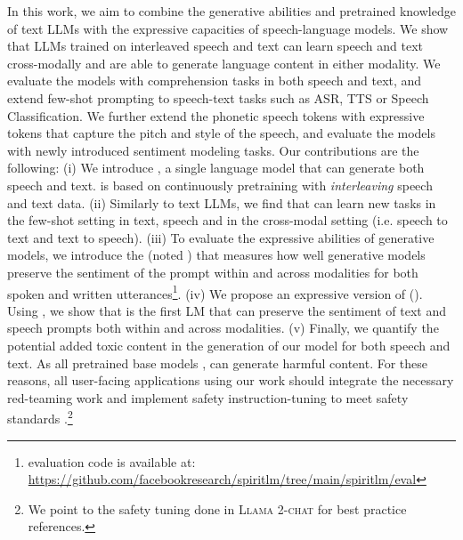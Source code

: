 In this work, we aim to combine the generative abilities and pretrained knowledge of text LLMs with the expressive capacities of speech-language models. We show that LLMs trained on interleaved speech and text can learn speech and text cross-modally and are able to generate language content in either modality.
We evaluate the models with comprehension tasks in both speech and text, and extend few-shot prompting to speech-text tasks such as ASR, TTS or Speech Classification.
We further extend the phonetic speech tokens with expressive tokens that capture the pitch and style of the speech, and evaluate the models with newly introduced sentiment modeling tasks. Our contributions are the following:
(i) We introduce \spot{}, a single language model that can generate both speech and text. \spot is based on continuously pretraining \llamatwo with \textit{interleaving} speech and text data. (ii) Similarly to text LLMs, we find that \spot can learn new tasks in the few-shot setting in text, speech and in the cross-modal setting (i.e. speech to text and text to speech). (iii) To evaluate the expressive abilities of generative models, we introduce the \sentimentbenchmark (noted \sentimentbenchmarkSHORT) that measures how well generative models preserve the sentiment of the prompt within and across modalities for both spoken and written utterances\footnote{\label{stsppage}\sentimentbenchmarkSHORT evaluation code is available at: \url{https://github.com/facebookresearch/spiritlm/tree/main/spiritlm/eval}}. (iv) We propose an expressive version of \spot (\spotexpressive). Using \sentimentbenchmarkSHORT, we show that \spot is the first LM that can preserve the sentiment of text and speech prompts both within and across modalities. (v) Finally, we quantify the potential added toxic content in the generation of our model for both speech and text. As all pretrained base models \citep{stochastic_parrots,Solaiman}, \spot can generate harmful content. For these reasons, all user-facing applications using our work should integrate the necessary red-teaming work and implement safety instruction-tuning to meet safety standards \citep{touvron2023llama2}.\footnote{We point to the safety tuning done in \textsc{Llama 2-chat} for best practice references.} 

\iffalse
\begin{itemize}
    \item We introduce \spot{}, a single language model that can generate both speech and text \ben{update with 'release' when it is approved}
    \item We found that \spot can perform cross-modal few-shot generation, and is able to perform simple speech-text tasks
    \item We propose an expressive version of \spot, and introduce a new task called Sentiment Modeling that evaluates the sentiment preservation of Text \& Speech LMs.
\end{itemize}
\fi 

